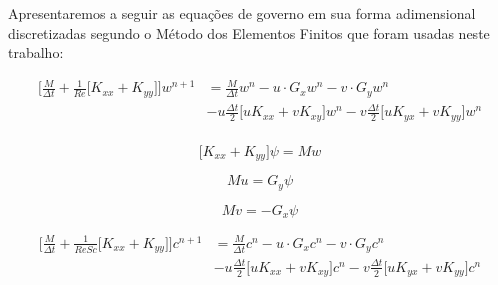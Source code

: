 \medskip
Apresentaremos a seguir as equações de governo em sua 
forma adimensional discretizadas segundo o Método dos Elementos 
Finitos que foram usadas neste trabalho:

\begin{equation} \label{vorticity taylor}
\begin{aligned}
 \bigg[ \frac{M}{\Delta t} + \frac{1}{\textit{Re}} \Big[ K_{xx} + K_{yy} \Big] \bigg] w^{n+1}
 & = \frac{M}{\Delta t} w^{n}
 - u \cdot G_x  w^{n}
 - v \cdot G_y w^{n} \\
 & - u
 \frac{\Delta t}{2}
 \big[
 u K_{xx}
 + v K_{xy}
 \big]
 w^{n} 
 - v
 \frac{\Delta t}{2}
 \Big[
 u K_{yx}
 + v K_{yy}
 \Big]
 w^{n}\\
\end{aligned}
\end{equation}

\begin{equation}
 \Big[ K_{xx} + K_{yy} \Big] \psi = Mw
\end{equation}

\begin{equation}
 Mu = G_y \psi 
\end{equation}

\begin{equation}
 Mv = - G_x \psi 
\end{equation}

\begin{equation}
\begin{aligned}
 \bigg[ \frac{M}{\Delta t} + \frac{1}{\textit{ReSc}} \Big[ K_{xx} + K_{yy} \Big] \bigg] c^{n+1}
 & = \frac{M}{\Delta t} c^{n}
 - u \cdot G_x  c^{n}
 - v \cdot G_y c^{n} \\
 & - u
 \frac{\Delta t}{2}
 \big[
 u K_{xx}
 + v K_{xy}
 \big]
 c^{n} 
 - v
 \frac{\Delta t}{2}
 \Big[
 u K_{yx}
 + v K_{yy}
 \Big]
 c^{n} 
\end{aligned}
\end{equation}


\newpage
